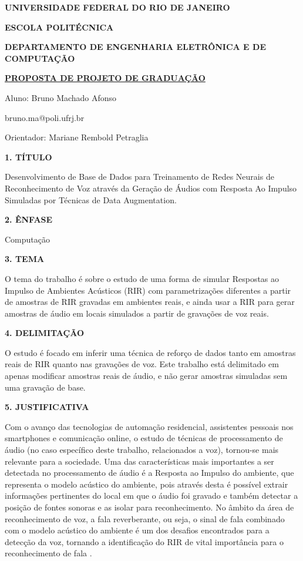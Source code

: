 \documentclass[a4paper,12pt,oneside,openany]{report}
\begin{document}
\begin{center}
\textbf{UNIVERSIDADE FEDERAL DO RIO DE JANEIRO}
\vspace{-0.2cm}

\textbf{ESCOLA POLITÉCNICA}
\vspace{-0.2cm}

\textbf{DEPARTAMENTO DE ENGENHARIA ELETRÔNICA E DE COMPUTAÇÃO}
\vspace{0.8cm}

\underline{\textbf{PROPOSTA DE PROJETO DE GRADUAÇÃO}}

Aluno: Bruno Machado Afonso
\vspace{-0.2cm}

bruno.ma@poli.ufrj.br

Orientador: Mariane Rembold Petraglia
\end{center}

\textbf{1. TÍTULO}

Desenvolvimento de Base de Dados para Treinamento de Redes Neurais de Reconhecimento de Voz através da Geração de Áudios com Resposta
Ao Impulso Simuladas por Técnicas de Data Augmentation.

\vspace{0.4cm}
\textbf{2. ÊNFASE}

Computação

\vspace{0.4cm}
\textbf{3. TEMA}

O tema do trabalho é sobre o estudo de uma forma de simular Respostas ao Impulso de Ambientes Acústicos (RIR) com parametrizações diferentes a partir de amostras 
de RIR gravadas em ambientes reais, e ainda usar a RIR para gerar amostras de áudio em locais simulados a partir de gravações de voz reais.

\vspace{0.4cm}
\textbf{4. DELIMITAÇÃO}

O estudo é focado em inferir uma técnica de reforço de dados tanto em amostras reais de RIR quanto nas gravações de voz. Este trabalho está delimitado em apenas 
modificar amostras reais de áudio, e não gerar amostras simuladas sem uma gravação de base.

\vspace{0.4cm}
\textbf{5. JUSTIFICATIVA}

Com o avanço das tecnologias de automação residencial, assistentes pessoais nos smartphones e comunicação online, o estudo de técnicas de
processamento de áudio (no caso específico deste trabalho, relacionados a voz), tornou-se mais relevante para a sociedade.
Uma das características mais importantes a ser detectada no processamento de áudio é a Resposta ao Impulso do ambiente, 
que representa o modelo acústico do ambiente, pois através desta é possível extrair informações pertinentes do local em que o áudio foi gravado
e também detectar a posição de fontes sonoras e as isolar para reconhecimento.
No âmbito da área de reconhecimento de voz, a fala reverberante, ou seja, o sinal de fala combinado com o modelo acústico do ambiente
é um dos desafios encontrados para a detecção da voz, tornando a identificação do RIR de vital importância para o reconhecimento de fala \cite{FAR-FIELD_ASR}.
\end{document}
